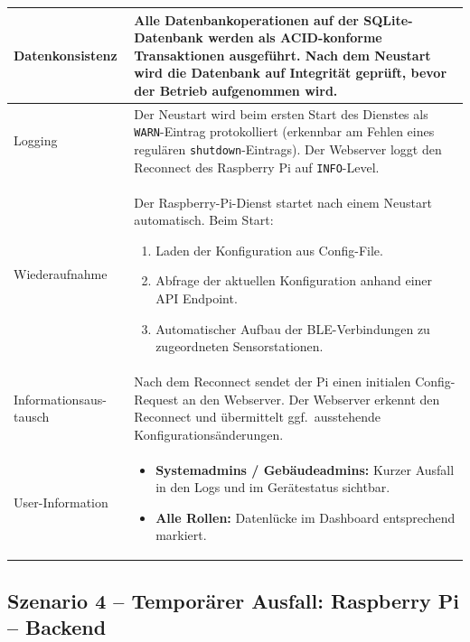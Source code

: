 \documentclass[12pt,a4paper]{article}
\begin{document}
    \begin{tabularx}{\linewidth}{L X}
    \toprule
    Datenkonsistenz &
    Alle Datenbankoperationen auf der SQLite-Datenbank werden als ACID-konforme
    Transaktionen ausgeführt. Nach dem Neustart wird die Datenbank auf Integrität geprüft,
    bevor der Betrieb aufgenommen wird. \\
    \midrule
    Logging &
    Der Neustart wird beim ersten Start des Dienstes als \texttt{WARN}-Eintrag protokolliert
    (erkennbar am Fehlen eines regulären \texttt{shutdown}-Eintrags).
    Der Webserver loggt den Reconnect des Raspberry Pi auf \texttt{INFO}-Level. \\
    \midrule
    Wiederaufnahme &
    Der Raspberry-Pi-Dienst startet nach einem Neustart automatisch. Beim Start:
    \begin{enumerate}[leftmargin=1.5em, itemsep=2pt, topsep=0pt]
            \item Laden der Konfiguration aus Config-File.
            \item Abfrage der aktuellen Konfiguration anhand einer API Endpoint.
            \item Automatischer Aufbau der BLE-Verbindungen zu zugeordneten Sensorstationen.
    \end{enumerate} \\
    \midrule
    Informationsaus-
    tausch &
    Nach dem Reconnect sendet der Pi einen initialen Config-Request an den Webserver.
    Der Webserver erkennt den Reconnect und übermittelt ggf.\ ausstehende
    Konfigurationsänderungen. \\
    \midrule
    User-Information &
    \begin{minipage}[t]{\linewidth}
        \begin{itemize}[leftmargin=1.2em, itemsep=2pt, topsep=0pt]
            \item \textbf{Systemadmins / Gebäudeadmins:} Kurzer Ausfall in den Logs und
            im Gerätestatus sichtbar.
            \item \textbf{Alle Rollen:} Datenlücke im Dashboard entsprechend markiert.
        \end{itemize}
    \end{minipage} \\
    \bottomrule
    \end{tabularx}


    \subsection{Szenario 4 – Temporärer Ausfall: Raspberry Pi – Backend}
\end{document}
